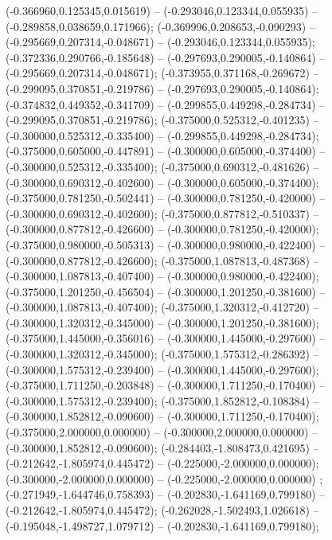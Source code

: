  (-0.366960,0.125345,0.015619) -- (-0.293046,0.123344,0.055935) -- (-0.289858,0.038659,0.171966);
 (-0.369996,0.208653,-0.090293) -- (-0.295669,0.207314,-0.048671) -- (-0.293046,0.123344,0.055935);
 (-0.372336,0.290766,-0.185648) -- (-0.297693,0.290005,-0.140864) -- (-0.295669,0.207314,-0.048671);
 (-0.373955,0.371168,-0.269672) -- (-0.299095,0.370851,-0.219786) -- (-0.297693,0.290005,-0.140864);
 (-0.374832,0.449352,-0.341709) -- (-0.299855,0.449298,-0.284734) -- (-0.299095,0.370851,-0.219786);
 (-0.375000,0.525312,-0.401235) -- (-0.300000,0.525312,-0.335400) -- (-0.299855,0.449298,-0.284734);
 (-0.375000,0.605000,-0.447891) -- (-0.300000,0.605000,-0.374400) -- (-0.300000,0.525312,-0.335400);
 (-0.375000,0.690312,-0.481626) -- (-0.300000,0.690312,-0.402600) -- (-0.300000,0.605000,-0.374400);
 (-0.375000,0.781250,-0.502441) -- (-0.300000,0.781250,-0.420000) -- (-0.300000,0.690312,-0.402600);
 (-0.375000,0.877812,-0.510337) -- (-0.300000,0.877812,-0.426600) -- (-0.300000,0.781250,-0.420000);
 (-0.375000,0.980000,-0.505313) -- (-0.300000,0.980000,-0.422400) -- (-0.300000,0.877812,-0.426600);
 (-0.375000,1.087813,-0.487368) -- (-0.300000,1.087813,-0.407400) -- (-0.300000,0.980000,-0.422400);
 (-0.375000,1.201250,-0.456504) -- (-0.300000,1.201250,-0.381600) -- (-0.300000,1.087813,-0.407400);
 (-0.375000,1.320312,-0.412720) -- (-0.300000,1.320312,-0.345000) -- (-0.300000,1.201250,-0.381600);
 (-0.375000,1.445000,-0.356016) -- (-0.300000,1.445000,-0.297600) -- (-0.300000,1.320312,-0.345000);
 (-0.375000,1.575312,-0.286392) -- (-0.300000,1.575312,-0.239400) -- (-0.300000,1.445000,-0.297600);
 (-0.375000,1.711250,-0.203848) -- (-0.300000,1.711250,-0.170400) -- (-0.300000,1.575312,-0.239400);
 (-0.375000,1.852812,-0.108384) -- (-0.300000,1.852812,-0.090600) -- (-0.300000,1.711250,-0.170400);
 (-0.375000,2.000000,0.000000) -- (-0.300000,2.000000,0.000000) -- (-0.300000,1.852812,-0.090600);
 (-0.284403,-1.808473,0.421695) -- (-0.212642,-1.805974,0.445472) -- (-0.225000,-2.000000,0.000000);
 (-0.300000,-2.000000,0.000000) -- (-0.225000,-2.000000,0.000000) ;
 (-0.271949,-1.644746,0.758393) -- (-0.202830,-1.641169,0.799180) -- (-0.212642,-1.805974,0.445472);
 (-0.262028,-1.502493,1.026618) -- (-0.195048,-1.498727,1.079712) -- (-0.202830,-1.641169,0.799180);
